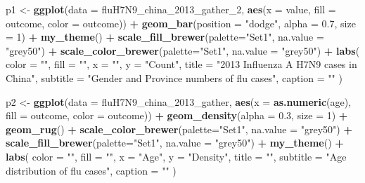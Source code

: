 \documentclass[]{book}
\newenvironment{Shaded}{\begin{snugshade}}{\end{snugshade}}
\newcommand{\DataTypeTok}[1]{\textcolor[rgb]{0.13,0.29,0.53}{#1}}
\newcommand{\DecValTok}[1]{\textcolor[rgb]{0.00,0.00,0.81}{#1}}
\newcommand{\FloatTok}[1]{\textcolor[rgb]{0.00,0.00,0.81}{#1}}
\newcommand{\KeywordTok}[1]{\textcolor[rgb]{0.13,0.29,0.53}{\textbf{#1}}}
\newcommand{\NormalTok}[1]{#1}
\newcommand{\OperatorTok}[1]{\textcolor[rgb]{0.81,0.36,0.00}{\textbf{#1}}}
\newcommand{\StringTok}[1]{\textcolor[rgb]{0.31,0.60,0.02}{#1}}
\begin{document}
\begin{Shaded}
\begin{Highlighting}[]
{\NormalTok{p1 <-}\StringTok{ }\KeywordTok{ggplot}\NormalTok{(}\DataTypeTok{data =}\NormalTok{ fluH7N9_china_}\DecValTok{2013}\NormalTok{_gather_}\DecValTok{2}\NormalTok{, }\KeywordTok{aes}\NormalTok{(}\DataTypeTok{x =}\NormalTok{ value, }
                                                     \DataTypeTok{fill =}\NormalTok{ outcome, }
                                                     \DataTypeTok{color =}\NormalTok{ outcome)) }\OperatorTok{+}
\StringTok{  }\KeywordTok{geom_bar}\NormalTok{(}\DataTypeTok{position =} \StringTok{"dodge"}\NormalTok{, }\DataTypeTok{alpha =} \FloatTok{0.7}\NormalTok{, }\DataTypeTok{size =} \DecValTok{1}\NormalTok{) }\OperatorTok{+}
\StringTok{  }\KeywordTok{my_theme}\NormalTok{() }\OperatorTok{+}
\StringTok{  }\KeywordTok{scale_fill_brewer}\NormalTok{(}\DataTypeTok{palette=}\StringTok{"Set1"}\NormalTok{, }\DataTypeTok{na.value =} \StringTok{"grey50"}\NormalTok{) }\OperatorTok{+}
\StringTok{  }\KeywordTok{scale_color_brewer}\NormalTok{(}\DataTypeTok{palette=}\StringTok{"Set1"}\NormalTok{, }\DataTypeTok{na.value =} \StringTok{"grey50"}\NormalTok{) }\OperatorTok{+}
\StringTok{  }\KeywordTok{labs}\NormalTok{(}
    \DataTypeTok{color =} \StringTok{""}\NormalTok{,}
    \DataTypeTok{fill =} \StringTok{""}\NormalTok{,}
    \DataTypeTok{x =} \StringTok{""}\NormalTok{,}
    \DataTypeTok{y =} \StringTok{"Count"}\NormalTok{,}
    \DataTypeTok{title =} \StringTok{"2013 Influenza A H7N9 cases in China"}\NormalTok{,}
    \DataTypeTok{subtitle =} \StringTok{"Gender and Province numbers of flu cases"}\NormalTok{,}
    \DataTypeTok{caption =} \StringTok{""}
\NormalTok{  )}

\NormalTok{p2 <-}\StringTok{ }\KeywordTok{ggplot}\NormalTok{(}\DataTypeTok{data =}\NormalTok{ fluH7N9_china_}\DecValTok{2013}\NormalTok{_gather, }\KeywordTok{aes}\NormalTok{(}\DataTypeTok{x =} \KeywordTok{as.numeric}\NormalTok{(age), }
                                                   \DataTypeTok{fill =}\NormalTok{ outcome, }
                                                   \DataTypeTok{color =}\NormalTok{ outcome)) }\OperatorTok{+}
\StringTok{  }\KeywordTok{geom_density}\NormalTok{(}\DataTypeTok{alpha =} \FloatTok{0.3}\NormalTok{, }\DataTypeTok{size =} \DecValTok{1}\NormalTok{) }\OperatorTok{+}
\StringTok{  }\KeywordTok{geom_rug}\NormalTok{() }\OperatorTok{+}
\StringTok{  }\KeywordTok{scale_color_brewer}\NormalTok{(}\DataTypeTok{palette=}\StringTok{"Set1"}\NormalTok{, }\DataTypeTok{na.value =} \StringTok{"grey50"}\NormalTok{) }\OperatorTok{+}
\StringTok{  }\KeywordTok{scale_fill_brewer}\NormalTok{(}\DataTypeTok{palette=}\StringTok{"Set1"}\NormalTok{, }\DataTypeTok{na.value =} \StringTok{"grey50"}\NormalTok{) }\OperatorTok{+}
\StringTok{  }\KeywordTok{my_theme}\NormalTok{() }\OperatorTok{+}
\StringTok{  }\KeywordTok{labs}\NormalTok{(}
    \DataTypeTok{color =} \StringTok{""}\NormalTok{,}
    \DataTypeTok{fill =} \StringTok{""}\NormalTok{,}
    \DataTypeTok{x =} \StringTok{"Age"}\NormalTok{,}
    \DataTypeTok{y =} \StringTok{"Density"}\NormalTok{,}
    \DataTypeTok{title =} \StringTok{""}\NormalTok{,}
    \DataTypeTok{subtitle =} \StringTok{"Age distribution of flu cases"}\NormalTok{,}
    \DataTypeTok{caption =} \StringTok{""}
\NormalTok{  )}

}
\end{Highlighting}
\end{Shaded}
\end{document}
